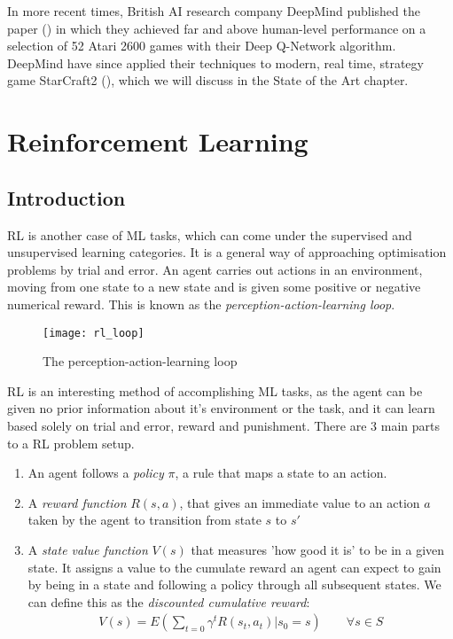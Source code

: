 In more recent times, British AI research company DeepMind published the paper (\cite{deepmind1}) in which they achieved far and above
human-level performance on a selection of 52 Atari 2600 games with their Deep Q-Network algorithm.
DeepMind have since applied their techniques to modern, real time, strategy game StarCraft2
(\cite{starcraft}), which we will discuss in the State of the Art chapter. 

\section{Reinforcement Learning}
\subsection{Introduction}
RL is another case of ML tasks, which can come under the supervised and unsupervised learning
categories. It is a general way of approaching optimisation problems by trial and error. An agent
carries out actions in an environment, moving from one state to a new state and is given some
positive or negative numerical reward. This is known as the \textit{perception-action-learning
    loop}.

\begin{figure}[h]
    \texttt{[image: rl\_loop]}
    \centering
    \caption{The perception-action-learning loop}
\end{figure}

RL is an interesting method of accomplishing ML tasks, as the agent can be given no prior
information about it's environment or the task, and it can learn based solely on trial and error,
reward and punishment. There are 3 main parts to a RL problem setup.

\begin{enumerate}
    \item An agent follows a \textit{policy} $\pi$, a rule that maps a state to an action.
    \item A \textit{reward function} $R(s, a)$, that gives an immediate value to an action $a$ taken
          by the agent to transition from state $s$ to $s'$
    \item A \textit{state value function} $V(s)$ that measures 'how good it is' to be in a given
          state. It assigns a value to the cumulate reward an agent can expect to gain by being in a
          state and following a policy through all subsequent states. We can define this as the
          \textit{discounted cumulative reward}:
          \begin{align}
              V(s) = E(\sum_{t=0}\gamma^tR(s_t, a_t) | s_0 = s) \qquad \forall s \in S
          \end{align}
\end{enumerate}

